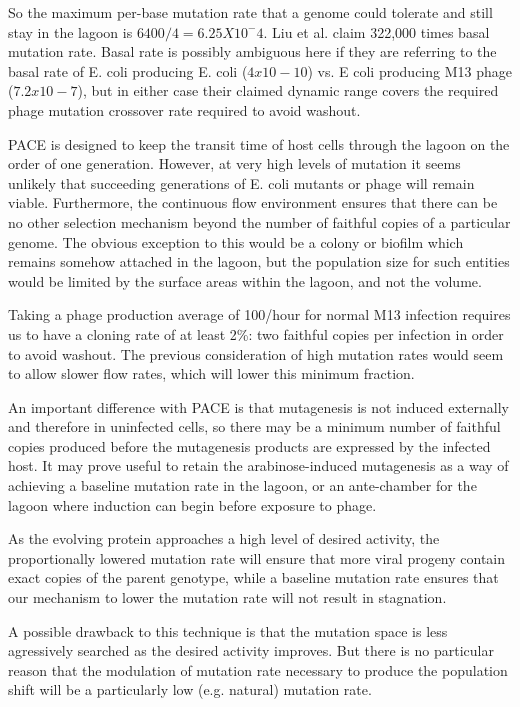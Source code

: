 \documentclass[10pt,letterpaper]{article}
\begin{document}
So the maximum per-base mutation rate that a genome could tolerate and still stay in the lagoon is $6400/4 = 6.25 X 10^-4$.
Liu et al. claim 322,000 times basal mutation rate. Basal rate is possibly ambiguous here if they are referring to the basal rate of E. coli producing E. coli  ($4x10-10$) vs. E coli producing M13 phage ($7.2 x 10-7$), but in either case their claimed dynamic range covers the required phage mutation crossover rate required to avoid washout.

PACE is designed to keep the transit time of host cells through the lagoon on the order of one generation.  However, at very high levels of mutation it seems unlikely that succeeding generations of E. coli mutants or phage will remain viable. Furthermore, the continuous flow environment ensures that there can be no other selection mechanism beyond the number of faithful copies of a particular genome.  The obvious exception to this would be a colony or biofilm which remains somehow attached in the lagoon, but the population size for such entities would be limited by the surface areas within the lagoon, and not the volume.

Taking a phage production average of 100/hour for normal M13 infection requires us to have a cloning rate of at least 2\%: two faithful copies per infection in order to avoid washout.  The previous consideration of high mutation rates would seem to allow slower flow rates, which will lower this minimum fraction.

An important difference with PACE is that mutagenesis is not induced externally and therefore in uninfected cells, so there may be a minimum number of faithful copies produced before the mutagenesis products are expressed by the infected host.  It may prove useful to retain the arabinose-induced mutagenesis as a way of achieving a baseline mutation rate in the lagoon, or an ante-chamber for the lagoon where induction can begin before exposure to phage.

As the evolving protein approaches a high level of desired activity, the proportionally lowered mutation rate will ensure that more viral progeny contain exact copies of the parent genotype, while a baseline mutation rate ensures that our mechanism to lower the mutation rate will not result in stagnation.

A possible drawback to this technique is that the mutation space is less agressively searched as the desired activity improves.  But there is no particular reason that the modulation of mutation rate necessary to produce the population shift will be a particularly low (e.g. natural) mutation rate.
\end{document}

